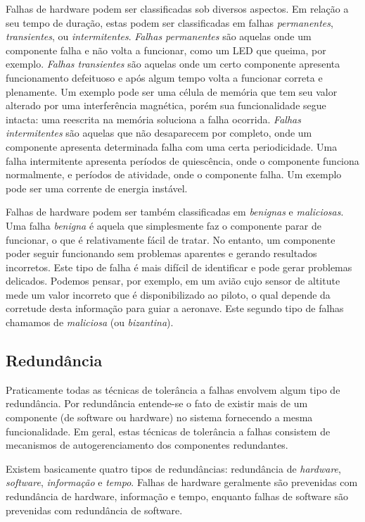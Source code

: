 Falhas de hardware podem ser classificadas sob diversos aspectos. Em relação a seu tempo de duração, estas podem ser classificadas em falhas \emph{permanentes}, \emph{transientes}, ou \emph{intermitentes}. \emph{Falhas permanentes} são aquelas onde um componente falha e não volta a funcionar, como um LED que queima, por exemplo. \emph{Falhas transientes} são aquelas onde um certo componente apresenta funcionamento defeituoso e após algum tempo volta a funcionar correta e plenamente. Um exemplo pode ser uma célula de memória que tem seu valor alterado por uma interferência magnética, porém sua funcionalidade segue intacta: uma reescrita na memória soluciona a falha ocorrida. \emph{Falhas intermitentes} são aquelas que não desaparecem por completo, onde um componente apresenta determinada falha com uma certa periodicidade. Uma falha intermitente apresenta períodos de quiescência, onde o componente funciona normalmente, e períodos de atividade, onde o componente falha. Um exemplo pode ser uma corrente de energia instável.

Falhas de hardware podem ser também classificadas em \emph{benignas} e \emph{maliciosas}. Uma falha \emph{benigna} é aquela que simplesmente faz o componente parar de funcionar, o que é relativamente fácil de tratar. No entanto, um componente poder seguir funcionando sem problemas aparentes e gerando resultados incorretos. Este tipo de falha é mais difícil de identificar e pode gerar problemas delicados. Podemos pensar, por exemplo, em um avião cujo sensor de altitute mede um valor incorreto que é disponibilizado ao piloto, o qual depende da corretude desta informação para guiar a aeronave. Este segundo tipo de falhas chamamos de \emph{maliciosa} (ou \emph{bizantina}).

\subsection{Redundância} %
\label{sub:redundancia}

Praticamente todas as técnicas de tolerância a falhas envolvem algum tipo de redundância. Por redundância entende-se o fato de existir mais de um componente (de software ou hardware) no sistema fornecendo a mesma funcionalidade. Em geral, estas técnicas de tolerância a falhas consistem de mecanismos de autogerenciamento dos componentes redundantes.

Existem basicamente quatro tipos de redundâncias: redundância de \emph{hardware}, \emph{software}, \emph{informação} e \emph{tempo}. Falhas de hardware geralmente são prevenidas com redundância de hardware, informação e tempo, enquanto falhas de software são prevenidas com redundância de software.

